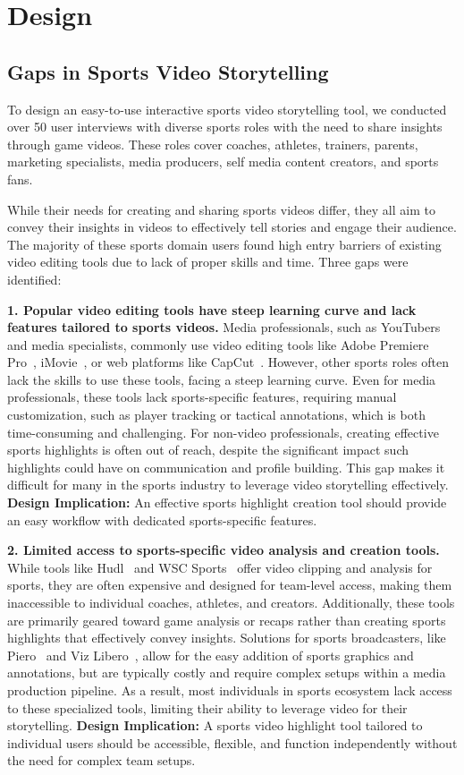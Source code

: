 \section{\SB{} Design}
\subsection{Gaps in Sports Video Storytelling
}
To design an easy-to-use interactive sports video storytelling tool, we conducted over 50 user interviews with diverse sports roles with the need to share insights through game videos. These roles cover coaches, athletes, trainers, parents, marketing specialists, media producers, self media content creators, and sports fans. 

While their needs for creating and sharing sports videos differ, they all aim to convey their insights in videos to effectively tell stories and engage their audience. The majority of these sports domain users found high entry barriers of existing video editing tools due to lack of proper skills and time. Three gaps were identified: 

\textbf{1. Popular video editing tools have steep learning curve and lack features tailored to sports videos.} Media professionals, such as YouTubers and media specialists, commonly use video editing tools like Adobe Premiere Pro~\cite{premiere}, iMovie~\cite{imovie}, or web platforms like CapCut~\cite{capcut}. However, other sports roles often lack the skills to use these tools, facing a steep learning curve. Even for media professionals, these tools lack sports-specific features, requiring manual customization, such as player tracking or tactical annotations, which is both time-consuming and challenging. For non-video professionals, creating effective sports highlights is often out of reach, despite the significant impact such highlights could have on communication and profile building. This gap makes it difficult for many in the sports industry to leverage video storytelling effectively.
\textbf{Design Implication:} An effective sports highlight creation tool should provide an easy workflow with dedicated sports-specific features.


\textbf{2. Limited access to sports-specific video analysis and creation tools.} 
While tools like Hudl~\cite{hudl} and WSC Sports~\cite{wscsports} offer video clipping and analysis for sports, they are often expensive and designed for team-level access, making them inaccessible to individual coaches, athletes, and creators.
Additionally, these tools are primarily geared toward game analysis or recaps rather than creating sports highlights that effectively convey insights. 
Solutions for sports broadcasters, like Piero~\cite{piero} and Viz Libero~\cite{viz-libero}, allow for the easy addition of sports graphics and annotations, but are typically costly and require complex setups within a media production pipeline. 
As a result, most individuals in sports ecosystem lack access to these specialized tools, limiting their ability to leverage video for their storytelling. 
\textbf{Design Implication:}
A sports video highlight tool tailored to individual users should be accessible, flexible, and function independently without the need for complex team setups.

